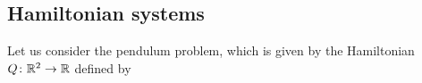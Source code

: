 \documentclass[final,onefignum,onetabnum]{siamonline171218}
\begin{document}
%

\subsection{Hamiltonian systems} Let us consider the pendulum problem, which is given by the Hamiltonian $Q \colon \mathbb{R}^2 \to \mathbb{R}$ defined by
\end{document}
